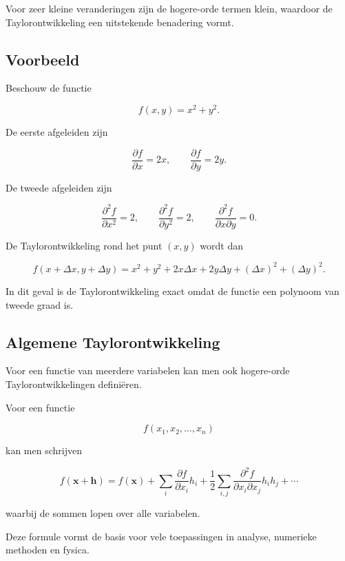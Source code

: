 \documentclass[11pt,a4paper]{article}
\begin{document}
    Voor zeer kleine veranderingen zijn de hogere-orde termen klein,
    waardoor de Taylorontwikkeling een uitstekende benadering vormt.

    \subsection{Voorbeeld}

    Beschouw de functie

    \[
        f(x,y) = x^2 + y^2.
    \]

    De eerste afgeleiden zijn

    \[
        \frac{\partial f}{\partial x} = 2x,
        \qquad
        \frac{\partial f}{\partial y} = 2y.
    \]

    De tweede afgeleiden zijn

    \[
        \frac{\partial^2 f}{\partial x^2} = 2,
        \qquad
        \frac{\partial^2 f}{\partial y^2} = 2,
        \qquad
        \frac{\partial^2 f}{\partial x \partial y} = 0.
    \]

    De Taylorontwikkeling rond het punt $(x,y)$ wordt dan

    \[
        f(x+\Delta x, y+\Delta y)
        =
        x^2 + y^2
        +
        2x\Delta x
        +
        2y\Delta y
        +
        (\Delta x)^2
        +
        (\Delta y)^2.
    \]

    In dit geval is de Taylorontwikkeling exact omdat de functie
    een polynoom van tweede graad is.

    \subsection{Algemene Taylorontwikkeling}

    Voor een functie van meerdere variabelen kan men ook hogere-orde
    Taylorontwikkelingen definiëren.

    Voor een functie

    \[
        f(x_1,x_2,\dots,x_n)
    \]

    kan men schrijven

    \[
        f(\mathbf{x}+\mathbf{h})
        =
        f(\mathbf{x})
        +
        \sum_i
        \frac{\partial f}{\partial x_i} h_i
        +
        \frac{1}{2}
        \sum_{i,j}
        \frac{\partial^2 f}{\partial x_i \partial x_j}
        h_i h_j
        +
        \cdots
    \]

    waarbij de sommen lopen over alle variabelen.

    Deze formule vormt de basis voor vele toepassingen in analyse,
    numerieke methoden en fysica.
\end{document}
